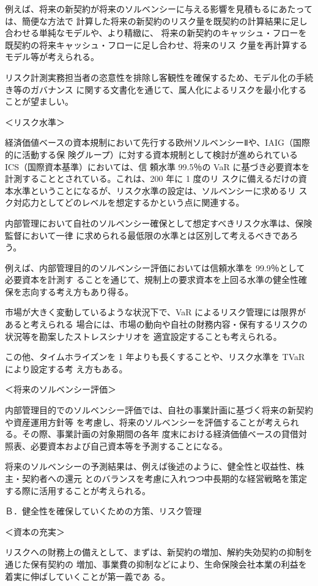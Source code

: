 \documentclass[report,gutter=10mm,fore-edge=10mm,uplatex,dvipdfmx]{jlreq}
\begin{document}
 例えば、将来の新契約が将来のソルベンシーに与える影響を見積もるにあたっては、簡便な方法で
計算した将来の新契約のリスク量を既契約の計算結果に足し合わせる単純なモデルや、より精緻に、
将来の新契約のキャッシュ・フローを既契約の将来キャッシュ・フローに足し合わせ、将来のリス
ク量を再計算するモデル等が考えられる。

 リスク計測実務担当者の恣意性を排除し客観性を確保するため、モデル化の手続き等のガバナンス
に関する文書化を通じて、属人化によるリスクを最小化することが望ましい。

＜リスク水準＞

 経済価値ベースの資本規制において先行する欧州ソルベンシーⅡや、IAIG（国際的に活動する保
険グループ）に対する資本規制として検討が進められている ICS（国際資本基準）においては、信
頼水準 99.5％の VaR に基づき必要資本を計測することとされている。これは、200 年に 1 度のリ
スクに備えるだけの資本水準ということになるが、リスク水準の設定は、ソルベンシーに求めるリ
スク対応力としてどのレベルを想定するかという点に関連する。

 内部管理において自社のソルベンシー確保として想定すべきリスク水準は、保険監督において一律
に求められる最低限の水準とは区別して考えるべきであろう。

 例えば、内部管理目的のソルベンシー評価においては信頼水準を 99.9％として必要資本を計測す
ることを通じて、規制上の要求資本を上回る水準の健全性確保を志向する考え方もあり得る。

 市場が大きく変動しているような状況下で、VaR によるリスク管理には限界があると考えられる
場合には、市場の動向や自社の財務内容・保有するリスクの状況等を勘案したストレスシナリオを
適宜設定することも考えられる。

 この他、タイムホライズンを 1 年よりも長くすることや、リスク水準を TVaR により設定する考
え方もある。

＜将来のソルベンシー評価＞

 内部管理目的でのソルベンシー評価では、自社の事業計画に基づく将来の新契約や資産運用方針等
を考慮し、将来のソルベンシーを評価することが考えられる。その際、事業計画の対象期間の各年
度末における経済価値ベースの貸借対照表、必要資本および自己資本等を予測することになる。

 将来のソルベンシーの予測結果は、例えば後述のように、健全性と収益性、株主・契約者への還元
とのバランスを考慮に入れつつ中長期的な経営戦略を策定する際に活用することが考えられる。

Ｂ．健全性を確保していくための方策、リスク管理

＜資本の充実＞

 リスクへの財務上の備えとして、まずは、新契約の増加、解約失効契約の抑制を通じた保有契約の
増加、事業費の抑制などにより、生命保険会社本業の利益を着実に伸ばしていくことが第一義であ
る。
\end{document}
